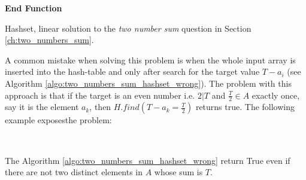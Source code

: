 \begin{algorithm}[H]
	
    \textbf{End Function}

	\label{algo:two_number_sum_hashset}
	\caption{Hashset, linear solution to the \textit{two number sum} question in Section \ref{ch:two_numbers_sum}.}
\end{algorithm}





A common mistake when solving this problem is when the whole input array is inserted into the hash-table and only after search for the target value $T-a_i$ (see Algorithm \ref{algo:two_numbers_sum_hashset_wrong}). The problem with this approach is that if the target is an even number i.e. $ 2 | T$ and $\frac{T}{2} \in A$ exactly once, say it is the element $a_k$, then $H.find(T-a_k=\frac{T}{2})$ returns true. The following example exposesthe problem:
\begin{example}
	\\ \hfill
	\begin{itemize}
		\item[] $A=\{1,2,5,4}\}$
	\item[] $T = 10$
\end{itemize}
The Algorithm \ref{algo:two_numbers_sum_hashset_wrong} return True even if there are not two distinct elements in $A$ whose sum is $T$.
\end{example}



